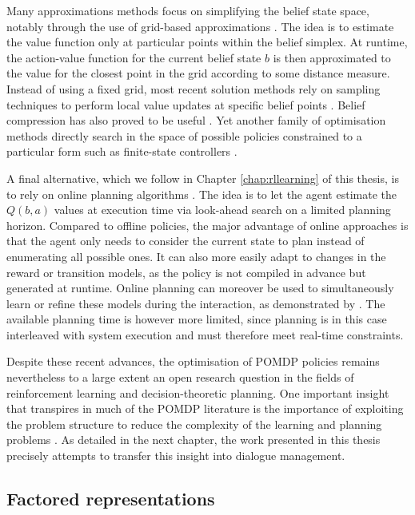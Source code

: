 Many approximations methods focus on simplifying the belief state space, notably through the use of grid-based approximations \citep{Zhou:2001}.  The idea is to estimate the value function only at particular points within the belief simplex. At runtime, the action-value function for the current belief state $b$ is then approximated to the value for the closest point in the grid according to some distance measure. Instead of using a fixed grid, most recent solution methods rely on sampling techniques to perform local value updates at specific belief points \citep{Pineau_2003,KurHsu08}. Belief compression has also proved to be useful \citep{Roy:2005}.  Yet another family of optimisation methods directly search in the space of possible policies constrained to a particular form such as finite-state controllers \citep{Hansen98}. 

A final alternative, which we follow in Chapter \ref{chap:rllearning} of this thesis, is to rely on online planning algorithms \citep{ross2008,NIPS2010_0740}.  The idea is to let the agent estimate the $Q(b,a)$ values at execution time via look-ahead search on a limited planning horizon. Compared to offline policies, the major advantage of online approaches is that the agent only needs to consider the current state to plan instead of enumerating all possible ones. It can also more easily adapt to changes in the reward or transition models, as the policy is not compiled in advance but generated at runtime. Online planning can moreover be used to simultaneously learn or refine these models during the interaction, as demonstrated by \cite{Ross:2011}.  The available planning time is however more limited, since planning is in this case interleaved with system execution and must therefore meet real-time constraints. %

Despite these recent advances, the optimisation of POMDP policies remains nevertheless to a large extent an open research question in the fields of reinforcement learning and decision-theoretic planning. One important insight that transpires in much of the POMDP literature is the importance of exploiting the problem structure to reduce the complexity of the learning and planning problems \citep{Pineau:2004,poupart2005}.  As detailed in the next chapter, the work presented in this thesis precisely attempts to transfer this insight into dialogue management. 

\subsection{Factored representations}
\label{sec:factored}

